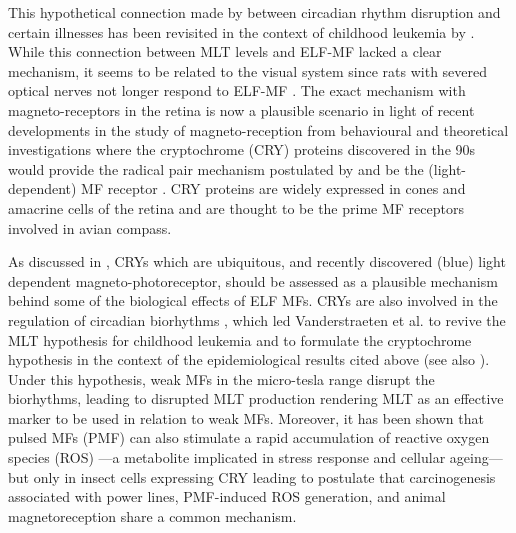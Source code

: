 \documentclass[letter,twoside]{article}
\begin{document}
 This hypothetical connection made by \citet{Stevens1996} between    circadian rhythm disruption and certain illnesses 
has been revisited in the context of childhood leukemia by \citet{Henshaw2005}. 
While this connection between MLT levels and ELF-MF lacked a clear mechanism, it seems to be related to the visual system since rats
with severed optical nerves not longer respond to ELF-MF \citep{Olcese1985}. The exact mechanism with magneto-receptors in the retina is now
a plausible scenario in light of recent developments in the study of magneto-reception from behavioural 
\citep{kirschvink1991,Phillips1992,Ritz2004,Ritz2009,Johnsen2005,Wiltschko2005,Gegear2008,Yoshii2009,Winklhofer2013,Wiltschko2014,
 Malkemper2015,Bazalova2016,Wiltschko2016,Sherrard2018}
and  theoretical investigations \citep[e.g.][]{Ritz2010,Hore2016}
where the cryptochrome (CRY) proteins discovered in the 90s  \citep{Ahmad1993,Ahmad1999,Chasmore1999,Ahmad2007,Chaves2011,Ahmad2016} would provide the radical pair mechanism postulated by \citet{Schulten1978} and
be the (light-dependent) MF receptor 
 \citep{Liedvogel2010,Ritz2010b,Hore2016,Michael2017}.   
 CRY proteins are widely expressed in cones and amacrine cells of the retina \citep[e.g.][]{Foley2011,Wong2018} and are thought to be the prime MF receptors  involved in avian compass.
 
 As discussed in \citet{Lagroye2011}, CRYs which are ubiquitous, and   recently discovered (blue) light dependent magneto-photoreceptor,  should be assessed as a plausible mechanism behind some of the biological effects of ELF MFs.
 CRYs are also involved in the regulation of circadian biorhythms  \citep[e.g.][]{vanderHorst1999,Yoshii2009,Ono2013,Wong2018}, which led Vanderstraeten et al. 
 \citep{Vanderstraeten2012,Vanderstraeten2012a,Vanderstraeten2015,Vanderstraeten2017} to revive the MLT hypothesis for childhood leukemia
 and to formulate the cryptochrome hypothesis   in the context of the epidemiological results cited above (see also \citet{Lagroye2011,Juutilainen2018}). Under this hypothesis,
weak MFs in the micro-tesla range disrupt the biorhythms, leading to disrupted MLT production rendering MLT as an effective marker  to be used in relation to weak MFs.  Moreover, it has been shown that pulsed MFs (PMF) can also stimulate a rapid accumulation of reactive oxygen species (ROS) ---a  metabolite implicated in stress response and cellular ageing--- but  only in insect cells expressing CRY \citep{Sherrard2018} leading \citet{Landler2018} to postulate that  carcinogenesis associated with power lines, PMF-induced ROS generation, and animal magnetoreception share a common mechanism.
\end{document}
